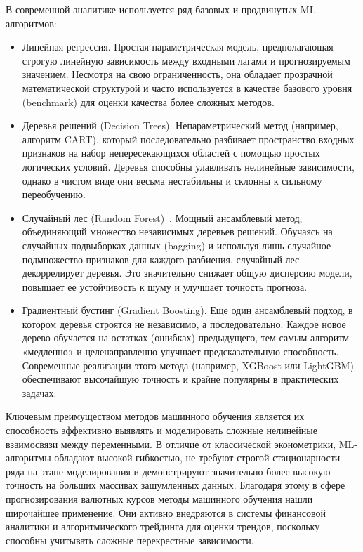 В современной аналитике используется ряд базовых и продвинутых ML-алгоритмов:
\begin{itemize}
    \item Линейная регрессия. Простая параметрическая модель, предполагающая строгую линейную зависимость между входными лагами и прогнозируемым значением. Несмотря на свою ограниченность, она обладает прозрачной математической структурой и часто используется в качестве базового уровня (benchmark) для оценки качества более сложных методов.
    \item Деревья решений (Decision Trees). Непараметрический метод (например, алгоритм CART), который последовательно разбивает пространство входных признаков на набор непересекающихся областей с помощью простых логических условий. Деревья способны улавливать нелинейные зависимости, однако в чистом виде они весьма нестабильны и склонны к сильному переобучению.
    \item Случайный лес (Random Forest)~\cite{breiman2001}. Мощный ансамблевый метод, объединяющий множество независимых деревьев решений. Обучаясь на случайных подвыборках данных (bagging) и используя лишь случайное подмножество признаков для каждого разбиения, случайный лес декоррелирует деревья. Это значительно снижает общую дисперсию модели, повышает ее устойчивость к шуму и улучшает точность прогноза.
    \item Градиентный бустинг (Gradient Boosting). Еще один ансамблевый подход, в котором деревья строятся не независимо, а последовательно. Каждое новое дерево обучается на остатках (ошибках) предыдущего, тем самым алгоритм «медленно» и целенаправленно улучшает предсказательную способность. Современные реализации этого метода (например, XGBoost или LightGBM) обеспечивают высочайшую точность и крайне популярны в практических задачах.
\end{itemize}

Ключевым преимуществом методов машинного обучения является их способность эффективно выявлять и моделировать сложные нелинейные взаимосвязи между переменными. В отличие от классической эконометрики, ML-алгоритмы обладают высокой гибкостью, не требуют строгой стационарности ряда на этапе моделирования и демонстрируют значительно более высокую точность на больших массивах зашумленных данных. Благодаря этому в сфере прогнозирования валютных курсов методы машинного обучения нашли широчайшее применение. Они активно внедряются в системы финансовой аналитики и алгоритмического трейдинга для оценки трендов, поскольку способны учитывать сложные перекрестные зависимости.


